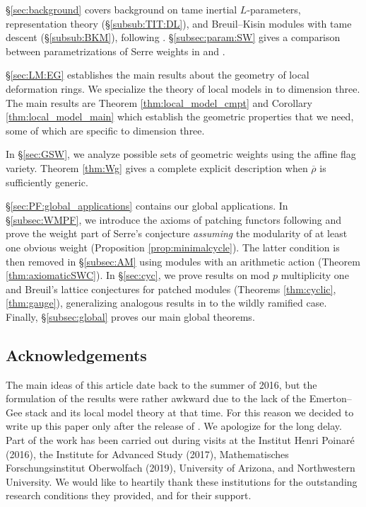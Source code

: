 \documentclass[oneside,a4paper,english, 11pt]{amsart}
\theoremstyle{plain}
\theoremstyle{plain}
\theoremstyle{plain}
\theoremstyle{plain}
\theoremstyle{plain}
\theoremstyle{plain}
\theoremstyle{definition}
\theoremstyle{definition}
\theoremstyle{definition}
\theoremstyle{remark}
\numberwithin{equation}{section}
\newcommand{\rhobar}{\overline{\rho}}
\begin{document}
\S \ref{sec:background} covers background on tame inertial $L$-parameters, representation theory (\S \ref{subsub:TIT:DL}), and Breuil--Kisin modules with tame descent (\S \ref{subsub:BKM}), following \cite{MLM}. 
\S \ref{subsec:param:SW} gives a comparison between parametrizations of Serre weights in \cite{MLM} and \cite{LLLM2}.  

\S \ref{sec:LM:EG} establishes the main results about the geometry of local deformation rings. We specialize the theory of local models in \cite{MLM} to dimension three.
The main results are Theorem \ref{thm:local_model_cmpt} and Corollary \ref{thm:local_model_main} which establish the geometric properties that we need, some of which are specific to dimension three.
%

In \S \ref{sec:GSW}, we analyze possible sets of geometric weights using the affine flag variety.  
Theorem \ref{thm:Wg} gives a complete explicit description when $\rhobar$ is sufficiently generic. 

\S \ref{sec:PF:global_applications} contains our global applications.  
In \S \ref{subsec:WMPF}, we introduce the axioms of patching functors following \cite[\S 6]{MLM} and prove the weight part of Serre's conjecture \emph{assuming} the modularity of at least one obvious weight (Proposition \ref{prop:minimalcycle}).
The latter condition is then removed in \S \ref{subsec:AM} using modules with an arithmetic action (Theorem \ref{thm:axiomaticSWC}).
%
In \S \ref{sec:cyc}, we prove results on mod $p$ multiplicity one and Breuil's lattice conjectures for patched modules (Theorems \ref{thm:cyclic}, \ref{thm:gauge}), generalizing analogous results in \cite{LLLM2} to the wildly ramified case.
Finally, \S \ref{subsec:global} proves our main global theorems.
%
%


%

%
%
%
%
%
%
%
%
%
%
%
%
%
%
%
%
%
%
%
%
%
%
%
%
%
%
%
%
%
%
%
%
%
%
%
%
%
%
%
%

\subsection{Acknowledgements}
The main ideas of this article date back to the summer of 2016, but the formulation of the results were rather awkward due to the lack of the Emerton--Gee stack and its local model theory at that time.
For this reason we decided to write up this paper only after the release of \cite{MLM}.
We apologize for the long delay.
Part of the work has been carried out during visits at the Institut Henri Poinar\'e (2016), the Institute for Advanced Study (2017), Mathematisches Forschungsinstitut Oberwolfach (2019), University of Arizona, and Northwestern University.
%
We would like to heartily thank these institutions for the outstanding research conditions they provided, and for their support.
\end{document}
